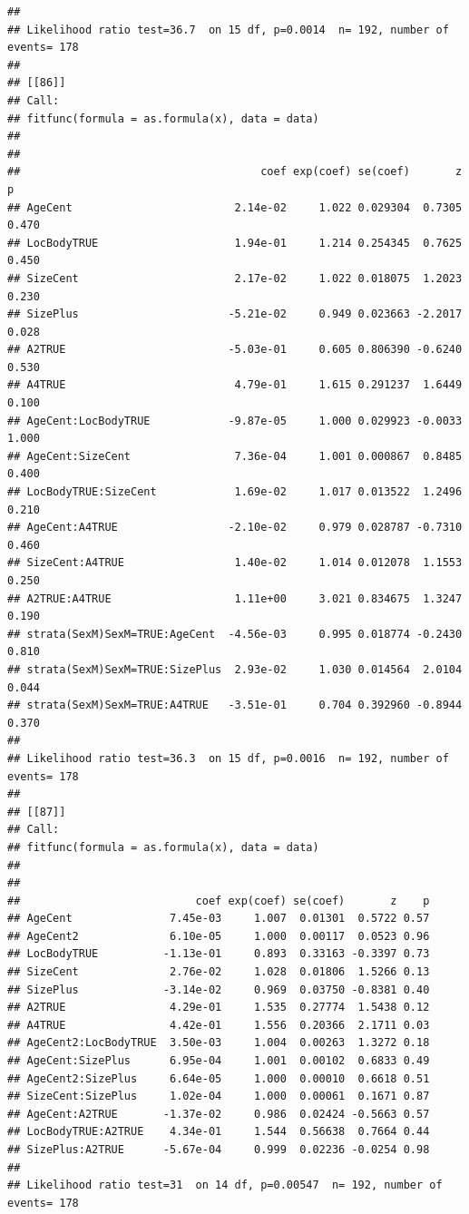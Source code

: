 \documentclass{article}\usepackage[]{graphicx}\usepackage[]{color}
\makeatletter
\newenvironment{kframe}{%
 \def\at@end@of@kframe{}%
 \ifinner\ifhmode%
  \def\at@end@of@kframe{\end{minipage}}%
  \begin{minipage}{\columnwidth}%
 \fi\fi%
 \def\FrameCommand##1{\hskip\@totalleftmargin \hskip-\fboxsep
 \colorbox{shadecolor}{##1}\hskip-\fboxsep
     \hskip-\linewidth \hskip-\@totalleftmargin \hskip\columnwidth}%
 \MakeFramed {\advance\hsize-\width
   \@totalleftmargin\z@ \linewidth\hsize
   \@setminipage}}%
 {\par\unskip\endMakeFramed%
 \at@end@of@kframe}
\newenvironment{knitrout}{}{} %
\makeatother
\begin{document}
\begin{knitrout}
\begin{kframe}
\begin{verbatim}
## 
## Likelihood ratio test=36.7  on 15 df, p=0.0014  n= 192, number of events= 178 
## 
## [[86]]
## Call:
## fitfunc(formula = as.formula(x), data = data)
## 
## 
##                                     coef exp(coef) se(coef)       z     p
## AgeCent                         2.14e-02     1.022 0.029304  0.7305 0.470
## LocBodyTRUE                     1.94e-01     1.214 0.254345  0.7625 0.450
## SizeCent                        2.17e-02     1.022 0.018075  1.2023 0.230
## SizePlus                       -5.21e-02     0.949 0.023663 -2.2017 0.028
## A2TRUE                         -5.03e-01     0.605 0.806390 -0.6240 0.530
## A4TRUE                          4.79e-01     1.615 0.291237  1.6449 0.100
## AgeCent:LocBodyTRUE            -9.87e-05     1.000 0.029923 -0.0033 1.000
## AgeCent:SizeCent                7.36e-04     1.001 0.000867  0.8485 0.400
## LocBodyTRUE:SizeCent            1.69e-02     1.017 0.013522  1.2496 0.210
## AgeCent:A4TRUE                 -2.10e-02     0.979 0.028787 -0.7310 0.460
## SizeCent:A4TRUE                 1.40e-02     1.014 0.012078  1.1553 0.250
## A2TRUE:A4TRUE                   1.11e+00     3.021 0.834675  1.3247 0.190
## strata(SexM)SexM=TRUE:AgeCent  -4.56e-03     0.995 0.018774 -0.2430 0.810
## strata(SexM)SexM=TRUE:SizePlus  2.93e-02     1.030 0.014564  2.0104 0.044
## strata(SexM)SexM=TRUE:A4TRUE   -3.51e-01     0.704 0.392960 -0.8944 0.370
## 
## Likelihood ratio test=36.3  on 15 df, p=0.0016  n= 192, number of events= 178 
## 
## [[87]]
## Call:
## fitfunc(formula = as.formula(x), data = data)
## 
## 
##                           coef exp(coef) se(coef)       z    p
## AgeCent               7.45e-03     1.007  0.01301  0.5722 0.57
## AgeCent2              6.10e-05     1.000  0.00117  0.0523 0.96
## LocBodyTRUE          -1.13e-01     0.893  0.33163 -0.3397 0.73
## SizeCent              2.76e-02     1.028  0.01806  1.5266 0.13
## SizePlus             -3.14e-02     0.969  0.03750 -0.8381 0.40
## A2TRUE                4.29e-01     1.535  0.27774  1.5438 0.12
## A4TRUE                4.42e-01     1.556  0.20366  2.1711 0.03
## AgeCent2:LocBodyTRUE  3.50e-03     1.004  0.00263  1.3272 0.18
## AgeCent:SizePlus      6.95e-04     1.001  0.00102  0.6833 0.49
## AgeCent2:SizePlus     6.64e-05     1.000  0.00010  0.6618 0.51
## SizeCent:SizePlus     1.02e-04     1.000  0.00061  0.1671 0.87
## AgeCent:A2TRUE       -1.37e-02     0.986  0.02424 -0.5663 0.57
## LocBodyTRUE:A2TRUE    4.34e-01     1.544  0.56638  0.7664 0.44
## SizePlus:A2TRUE      -5.67e-04     0.999  0.02236 -0.0254 0.98
## 
## Likelihood ratio test=31  on 14 df, p=0.00547  n= 192, number of events= 178 

\end{verbatim}
\end{kframe}
\end{knitrout}
\end{document}
